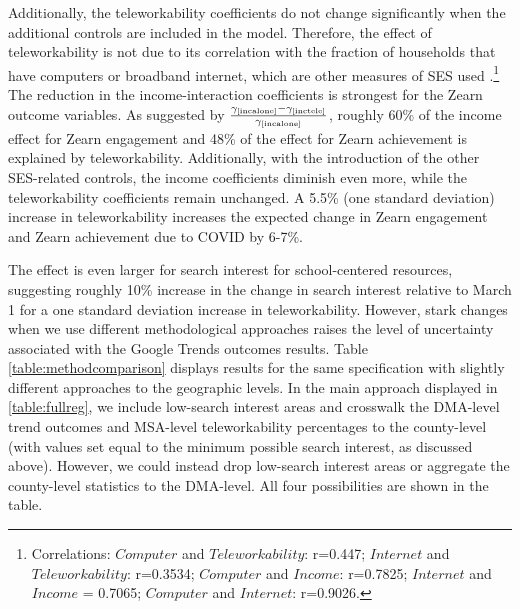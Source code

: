     Additionally, the teleworkability coefficients do not change significantly when the additional controls are included in the model.
    Therefore, the effect of teleworkability is not due to its correlation with the fraction of households that have computers or broadband internet, which are other measures of SES used \cite{bh1}.\footnote{Correlations: $Computer$ and $Teleworkability$: r=0.447; $Internet$ and $Teleworkability$: r=0.3534; $Computer$ and $Income$: r=0.7825; $Internet$ and $Income$ = 0.7065; $Computer$ and $Internet$: r=0.9026.}
    The reduction in the income-interaction coefficients is strongest for the Zearn outcome variables.
    As suggested by $\frac{\gamma_\refeq{incalone}-\gamma_\refeq{inctele}}{\gamma_\refeq{incalone}}$, roughly 60\% of the income effect for Zearn engagement and 48\% of the effect for Zearn achievement is explained by teleworkability.
    Additionally, with the introduction of the other SES-related controls, the income coefficients diminish even more, while the teleworkability coefficients remain unchanged.
    A 5.5\% (one standard deviation) increase in teleworkability increases the expected change in Zearn engagement and Zearn achievement due to COVID by 6-7\%.

    The effect is even larger for search interest for school-centered resources, suggesting roughly 10\% increase in the change in search interest relative to March 1 for a one standard deviation increase in teleworkability.
    However, stark changes when we use different methodological approaches raises the level of uncertainty associated with the Google Trends outcomes results.
    Table \ref{table:methodcomparison} displays results for the same specification with slightly different approaches to the geographic levels.
    In the main approach displayed in \ref{table:fullreg}, we include low-search interest areas and crosswalk the DMA-level trend outcomes and MSA-level teleworkability percentages to the county-level (with values set equal to the minimum possible search interest, as discussed above).
    However, we could instead drop low-search interest areas or aggregate the county-level statistics to the DMA-level.
    All four possibilities are shown in the table.


